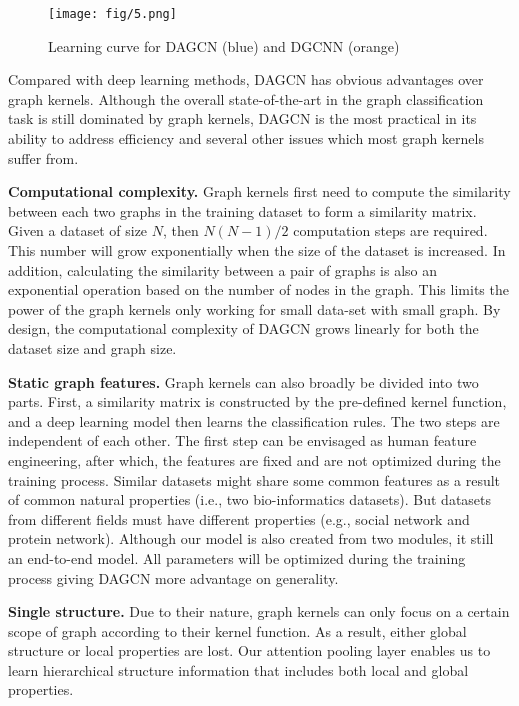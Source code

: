 \documentclass[conference]{IEEEtran}
\begin{document}
	\begin{figure*}
 	 	\centering
 	 		\texttt{[image: fig/5.png]}
 	 	    \caption{Learning curve for DAGCN (blue) and DGCNN (orange)}   
 	 	\label{fig:efficiency}
	\end{figure*}
	
	Compared with deep learning methods, DAGCN has obvious advantages over graph kernels. Although the overall state-of-the-art in the graph classification task is still dominated by graph kernels, DAGCN is the most practical in its ability to address efficiency and several other issues which most graph kernels suffer from.
	
	\textbf{Computational complexity.} Graph kernels first need to compute the similarity between each two graphs in the training dataset to form a similarity matrix. Given a dataset of size $N$, then $N(N-1)/2$ computation steps are required. This number will grow exponentially when the size of the dataset is increased. In addition, calculating the similarity between a pair of graphs is also an exponential operation based on the number of nodes in the graph. This limits the power of the graph kernels only working for small data-set with small graph. By design, the computational complexity of DAGCN grows linearly for both the dataset size and graph size.
	
	\textbf{Static graph features.} Graph kernels can also broadly be divided into two parts. First, a similarity matrix is constructed by the pre-defined kernel function, and a deep learning model then learns the classification rules. The two steps are independent of each other. The first step can be envisaged as human feature engineering, after which, the features are fixed and are not optimized during the training process. Similar datasets might share some common features as a result of common natural properties (i.e., two bio-informatics datasets). But datasets from different fields must have different properties (e.g., social network and protein network). Although our model is also created from two modules, it still an end-to-end model. All parameters will be optimized during the training process giving DAGCN more advantage on generality.
	
	\textbf{Single structure.} Due to their nature, graph kernels can only focus on a certain scope of graph according to their kernel function. As a result, either global structure or local properties are lost. Our attention pooling layer enables us to learn hierarchical structure information that includes both local and global properties.
		
\end{document}
